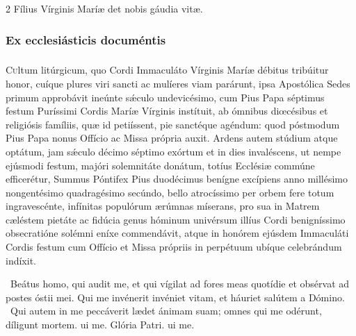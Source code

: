 \documentclass[9pt,twoside]{extarticle}
\begin{document}
\begin{multicols}{2}
\smallskip
{\small {} Fílius Vírginis Maríæ det nobis gáudia vitæ.}

\subsubsection*{\center \normalfont Ex ecclesiásticis documéntis}
\subsubsection*{\center \normalfont {}}

\lettrine{C}ultum litúrgicum, quo Cordi Immaculáto Vírginis Maríæ débitus tribúitur honor, cuíque plures viri sancti ac mulíeres viam parárunt, ipsa Apostólica Sedes primum approbávit ineúnte sǽculo undevicésimo, cum Pius Papa séptimus festum Puríssimi Cordis Maríæ Vírginis instítuit, ab ómnibus diœcésibus et religiósis famíliis, quæ id petiíssent, pie sanctéque agéndum: quod póstmodum Pius Papa nonus Offício ac Missa própria auxit. Ardens autem stúdium atque optátum, jam sǽculo décimo séptimo exórtum et in dies invaléscens, ut nempe ejúsmodi festum, majóri solemnitáte donátum, totíus Ecclésiæ commúne efficerétur, Summus Póntifex Pius duodécimus benígne excípiens anno millésimo nongentésimo quadragésimo secúndo, bello atrocíssimo per orbem fere totum ingravescénte, infínitas populórum ærúmnas míserans, pro sua in Matrem cæléstem pietáte ac fidúcia genus hóminum univérsum illíus Cordi benigníssimo obsecratióne solémni eníxe commendávit, atque in honórem ejúsdem Immaculáti Cordis festum cum Offício et Missa própriis in perpétuum ubíque celebrándum indíxit.

\smallskip
{}~Beátus homo, qui audit me, et qui vígilat ad fores meas quotídie et obsérvat ad postes óstii mei. \textred{*} Qui me invénerit invéniet vitam, et háuriet salútem a Dómino. ~Qui autem in me peccáverit lædet ánimam suam; omnes qui me odérunt, díligunt mortem. ui me. Glória Patri. ui me.


\end{multicols}
\end{document}
